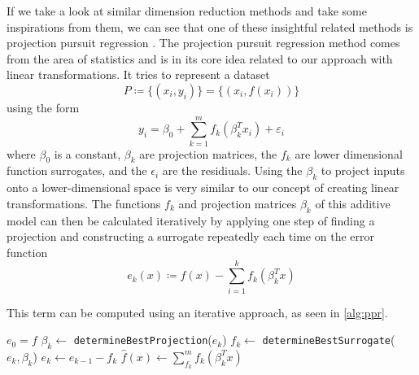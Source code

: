 \documentclass[
  a4paper,  %
  twoside,  %
  bibliography=totoc,
  headsepline,
  cleardoublepage=empty,
  parskip=half,
  draft=false
]{scrbook}
\begin{document}
If we take a look at similar dimension reduction methods and take some inspirations from them, we can see that one of these insightful related methods is projection pursuit regression \cite{huber1985projection}.
The projection pursuit regression method comes from the area of statistics and is in its core idea related to our approach with linear transformations.
It tries to represent a dataset
\begin{equation}
P \coloneqq \{(x_i, y_i)\}=\{(x_i, f(x_i))\}
\end{equation}
using the form
\begin{equation}
y_i=\beta_0 + \sum_{k=1}^m f_k(\beta_k^T x_i) + \varepsilon_i
\label{eq:ppr}
\end{equation}
where $\beta_0$ is a constant, $\beta_k$ are projection matrices, the $f_k$ are lower dimensional function surrogates, and the $\epsilon_i$ are the residiuals.
Using the $\beta_k$ to project inputs onto a lower-dimensional space is very similar to our concept of creating linear transformations.
The functions $f_k$ and projection matrices $\beta_k$ of this additive model can then be calculated iteratively by applying one step of finding a projection and constructing a surrogate repeatedly each time on the error function
\begin{equation}
e_k(x) \coloneqq f(x) - \sum_{i=1}^k f_k(\beta_k^T x)
\end{equation}

This term can be computed using an iterative approach, as seen in \cref{alg:ppr}.

\begin{mdframed}[style=algstyle,frametitle={\textbf{function} \texttt{projectionPursuitRegression}{$(f, k_{\text{max}})$}}]
\normalsize
\vspace{5.5mm}
\begin{algorithmic}[1]

    \State $e_0 = f$
    	\State $\beta_k \gets$ \texttt{determineBestProjection}($e_k$)
    	\State $f_k \gets$ \texttt{determineBestSurrogate}($e_k, \beta_k$)
    	\State $e_k \gets e_{k - 1} - f_k$
    \EndFor
    \State $\hat{f}(x) \gets \sum_{f_k}^m f_k(\beta_k^T x)$
    \State {}
\end{algorithmic}

\vspace{-1.5mm}
\delimit

	\label{alg:ppr}
\end{mdframed}
\end{document}
